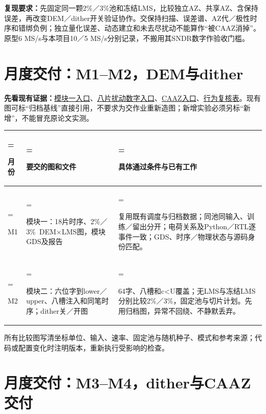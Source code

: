 \documentclass[zihao=5,a4paper,fontset=none]{ctexart}
\begin{document}
\textbf{复现要求：}先固定同一颗2\%／3\%池和冻结LMS，比较独立AZ、共享AZ、含保持误差，再改变DEM／dither开关验证协作。交保持扫描、误差谱、AZ代／极性时序和错绑负例；独立量化误差、动态建立和未去尽扰动不能算作``被CAAZ消掉''。原型6 MS/s与本项目10／5 MS/s分别记录，不搬用其SNDR数字作验收门槛。


\clearpage
\section{月度交付：M1--M2，DEM与dither}

\textbf{先看现有证据：}\href{../task1/README.md}{模块一入口}、\href{../task2/eight_rtl/README.md}{八片扰动数字入口}、\href{../task3/README.md}{CAAZ入口}、\href{BEHAVIORAL_STATUS.md}{行为复核表}。现有图可标``归档基线''直接引用，不要求为交作业重新造图；新增实验必须另标``新增''，不能冒充原论文实测。

\begin{table}[H]
\small
  \centering
  \begin{tabularx}{\linewidth}{>{\hsize=0.65\hsize\linewidth=\hsize\raggedright\arraybackslash}X>{\hsize=1.25\hsize\linewidth=\hsize\raggedright\arraybackslash}X>{\hsize=1.1\hsize\linewidth=\hsize\raggedright\arraybackslash}X}
    \toprule
    月份 & 要交的图和文件 & 具体通过条件与已有工作 \\
    \midrule
    M1 & 模块一：18片时序、2\%／3\%~DEM$\times$LMS图，模块GDS及报告 & 复用既有调度与归档数据；同池同输入、训练／留出分开；电荷关系及Python／RTL逐事件一致；GDS、时序／物理状态与源码身份匹配。 \\
    M2 & 模块二：六位字到lower／upper、八槽注入和同笔时序；dither关／开图 & 64字、八槽和c<U覆盖；无LMS与冻结LMS分别比较2\%／3\%，固定池与切片计划。先用归档图，异常不回绕、不静默丢弃。 \\
    \bottomrule
  \end{tabularx}
\end{table}

所有比较图写清坐标单位、输入、速率、固定池与随机种子、模式和参考来源；代码或配置变化时注明版本，重新执行受影响的检查。


\clearpage
\section{月度交付：M3--M4，dither与CAAZ交付}
\end{document}
